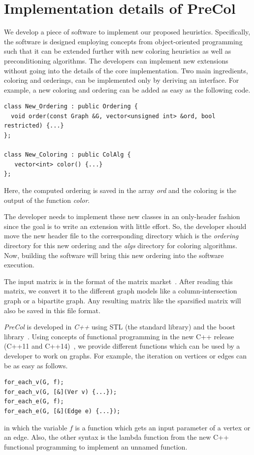\documentclass[12pt, twoside,a4paper,toc=bibliography]{scrbook}
\begin{document}
\section{Implementation details of PreCol}
\label{s.extend}
We develop a piece of software to implement our proposed heuristics.
Specifically, the software is designed employing concepts from object-oriented programming
such that it can be extended further with new coloring heuristics as well as preconditioning algorithms.
The developers can implement new extensions without going into the details of the core implementation.
Two main ingredients, coloring and orderings, can be implemented only by deriving an interface.
For example, a new coloring and ordering can be added as easy as the following code.
\begin{lstlisting}
class New_Ordering : public Ordering {
  void order(const Graph &G, vector<unsigned int> &ord, bool restricted) {...}
};

class New_Coloring : public ColAlg {
   vector<int> color() {...}
};
\end{lstlisting}
Here, the computed ordering is saved in the array \textit{ord} and the coloring is the output
of the function \textit{color}.

The developer needs to implement these new classes in an only-header fashion~\cite{headeronly}
since the goal is to write an extension with little effort. So, the developer should
move the new header file to the corresponding directory which is the \textit{ordering} directory
for this new ordering and the \textit{algs} directory for coloring algorithms.
Now, building the software will bring this new ordering into the software execution.

The input matrix is in the format of the matrix market~\cite{matrix-market}.
After reading this matrix, we convert it to the different graph models
like a column-intersection graph or a bipartite graph.
Any resulting matrix like the sparsified matrix will also be saved in this file format.

\textit{PreCol} is developed in \textit{C++} using STL (the standard library) and
the boost library~\cite{boost}.
Using concepts of functional programming
in the new C++ release (C++11 and C++14)~\cite{Sutherland2015},
we provide different functions which can be used
by a developer to work on graphs. For example, the iteration on vertices
or edges can be as easy as follows.
\begin{lstlisting}
for_each_v(G, f);
for_each_v(G, [&](Ver v) {...});
for_each_e(G, f);
for_each_e(G, [&](Edge e) {...});
\end{lstlisting}
in which the variable $f$ is a function which gets an input parameter of a vertex or an edge.
Also, the other syntax is the lambda function
from the new C++ functional programming to implement an unnamed function.
\end{document}
